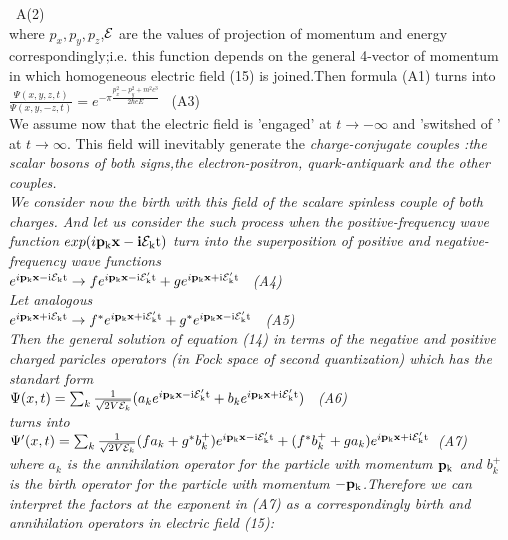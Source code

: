 \documentclass[a4paper,12pt] {article}
\begin{document}
 \ A(2)
\\ where $ p_x, p_y,p_z$,$\cal E$ \rm are the values of projection of momentum and energy
 correspondingly;i.e. this function depends on the general 4-vector of momentum in which
homogeneous electric field (15) is joined.Then formula (A1) turns into
\\ $\frac {\Psi (x,y,z,t)}{ \Psi (x,y,-z,t)} =e^{-\pi \frac{p_x^2-p_y^2+ m^2c^3}{2\hbar eE}} $ \ (A3) \\ We
assume now that the electric field is 'engaged' at $ t \to -\infty $ and  'switshed of ' at $ t \to \infty $. This
 field will inevitably generate the \it  charge-conjugate \rm  couples :the scalar bosons of both signs,the
 electron-positron, quark-antiquark and the other couples.\\ We consider now the birth with this field of
the \it  scalare spinless couple of both charges. \rm  And let us consider the such process when
 \it the positive-frequency wave function \rm $ exp(i\bf p \rm _k \bf x-i\cal E \rm _k t) $   \it turn into the
superposition of positive and negative-frequency wave functions \rm  \\ $ e^{i\bf p \rm_k \bf x\rm -i\cal E \rm _k t} \to f  e^{i \bf p\rm _k\bf x \rm -i\cal E \rm'_kt}+ge^{i \bf p\rm _k \bf x\rm +i\cal E\rm _k't} $ \ (A4)\\
 Let  analogous \\ $  e^{i {\bf p} \rm _k {\bf x} \rm  +i{\cal E} \rm _k t} \to f ^*  e^{i {\bf p}\rm _k {\bf x} \rm+i{\cal E }\rm '_kt}+g ^*e^{i{\bf p}\rm _k{\bf x }\rm -i{\cal E} \rm _k't} $ \ (A5)
\\ Then the general solution of equation (14) \it  in  terms of the negative and positive charged paricles
operators \rm  (in Fock space of second quantization) which has the standart form
\\$  \Psi (x,t)= \sum _k \frac {1}{\sqrt{2V{\cal E}_k}}( a_k e^{i \bf p\rm _k\bf x\rm -i{\cal E}'_kt}+b_k e^{i\bf p\rm _k\bf x \rm +i{\cal E}'_kt})$ \ (A6)
\\turns  into\\ $ \Psi '(x,t) = \sum _k \frac {1}{\sqrt{2V{\cal E}_k}}(fa_k+g^ *b^ + _k)e^{i{\bf  p}\rm _k{\bf x}\rm -i{\cal E}'_kt}+(f ^ *b ^+ _k +ga _k)e^{i{\bf p}\rm _k{\bf  x} \rm +i{\cal E}'_kt} $\ (A7)
\\ where $ a_k$ is the annihilation  operator for the particle with momentum $\bf p\rm _k$ and $ b_k^+$ is the birth operator for the particle with momentum $-\bf p \rm _k$.Therefore we can
interpret the factors at the exponent in  (A7) as a correspondingly \it birth and annihilation operators in  electric field \rm  (15):
\end{document}
